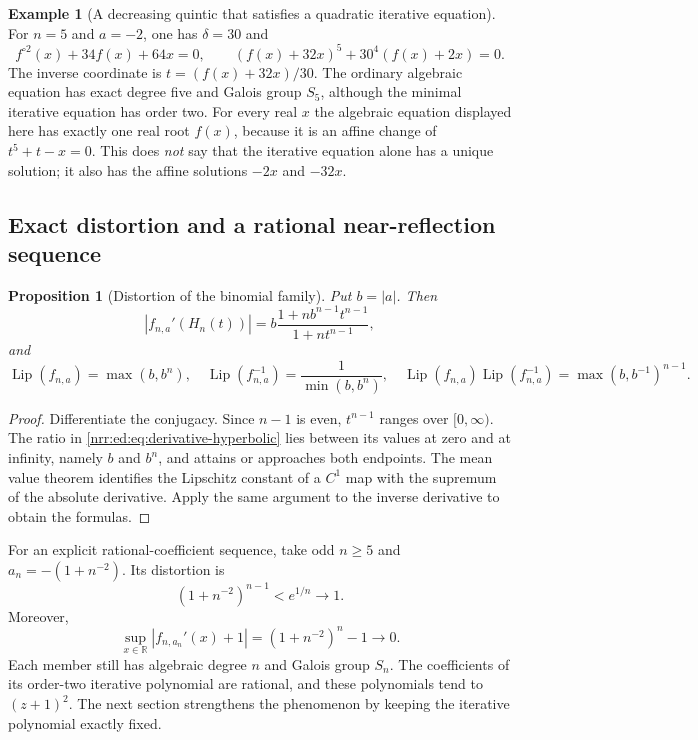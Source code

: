 \documentclass[11pt,letterpaper]{article}
\newtheorem{proposition}[theorem]{Proposition}
\theoremstyle{definition}
\newtheorem{example}[theorem]{Example}
\theoremstyle{remark}
\newcommand{\R}{\mathbb R}
\newcommand{\Lip}{\operatorname{Lip}}
\begin{document}
\begin{example}[A decreasing quintic that satisfies a quadratic iterative equation]
For $n=5$ and $a=-2$, one has $\delta=30$ and
\begin{equation}
 f^{\circ2}(x)+34f(x)+64x=0,
 \qquad
 (f(x)+32x)^5+30^4(f(x)+2x)=0.
 \label{nrr:ed:eq:quintic-example}
\end{equation}
The inverse coordinate is $t=(f(x)+32x)/30$. The ordinary algebraic equation has
exact degree five and Galois group $S_5$, although the minimal iterative equation
has order two. For every real $x$ the algebraic equation displayed here has exactly
one real root $f(x)$, because it is an affine change of $t^5+t-x=0$.
This does \emph{not} say that the iterative equation alone has a unique solution;
it also has the affine solutions $-2x$ and $-32x$.
\end{example}

\subsection{Exact distortion and a rational near-reflection sequence}

\begin{proposition}[Distortion of the binomial family]
\label{nrr:ed:prop:hyperbolic-distortion}
Put $b=|a|$. Then
\begin{equation}
 |f_{n,a}'(H_n(t))|
 =b\frac{1+nb^{n-1}t^{n-1}}{1+nt^{n-1}},
 \label{nrr:ed:eq:derivative-hyperbolic}
\end{equation}
and
\begin{equation}
 \Lip(f_{n,a})=\max(b,b^n),\quad
 \Lip(f_{n,a}^{-1})=\frac{1}{\min(b,b^n)},\quad
 \Lip(f_{n,a})\Lip(f_{n,a}^{-1})=\max(b,b^{-1})^{n-1}.
 \label{nrr:ed:eq:distortion-hyperbolic}
\end{equation}
\end{proposition}

\begin{proof}
Differentiate the conjugacy. Since $n-1$ is even, $t^{n-1}$ ranges over
$[0,\infty)$. The ratio in \eqref{nrr:ed:eq:derivative-hyperbolic} lies between its
values at zero and at infinity, namely $b$ and $b^n$, and attains or approaches
both endpoints. The mean value theorem identifies the Lipschitz constant of a
$C^1$ map with the supremum of the absolute derivative. Apply the same argument
to the inverse derivative to obtain the formulas.
\end{proof}

For an explicit rational-coefficient sequence, take odd $n\ge5$ and
$a_n=-(1+n^{-2})$. Its distortion is
\[
 (1+n^{-2})^{n-1}<e^{1/n}\longrightarrow1.
\]
Moreover,
\[
 \sup_{x\in\R}|f_{n,a_n}'(x)+1|
 =(1+n^{-2})^n-1\longrightarrow0.
\]
Each member still has algebraic degree $n$ and Galois group $S_n$. The coefficients
of its order-two iterative polynomial are rational, and these polynomials tend
to $(z+1)^2$. The next section strengthens the phenomenon by keeping the iterative
polynomial exactly fixed.
\end{document}
